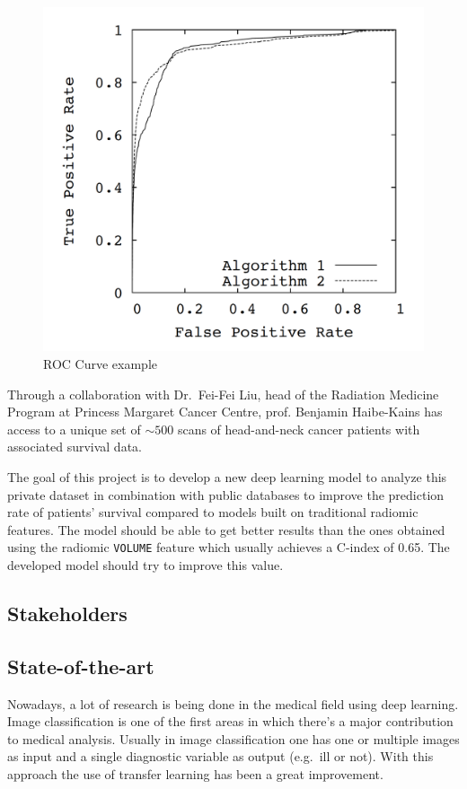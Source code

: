 \begin{figure}
  \centering
  \includegraphics[width=.5\linewidth]{images/roc_curve}
  \caption{ROC Curve example\label{fig:ROC-curve}}
\end{figure}

Through a collaboration with Dr.~Fei-Fei Liu, head of the Radiation Medicine Program at Princess
Margaret Cancer Centre, prof. Benjamin Haibe-Kains has access to a unique set of \( {\sim}500 \) 
scans of head-and-neck cancer patients with associated survival data. 

The goal of this project is to develop a new deep learning model to analyze this private 
dataset in combination with public databases to improve the prediction rate of patients' 
survival compared to models built on traditional radiomic features. The model should be 
able to get better results than the ones obtained using the radiomic \texttt{VOLUME} feature
which usually achieves a C-index of 0.65. The developed model should try to improve this value.


\subsection{Stakeholders}


\subsection{State-of-the-art}

Nowadays, a lot of research is being done in the medical field using deep learning. Image
classification is one of the first areas in which there's a major contribution to medical analysis.
Usually in image classification one has one or multiple images as input and a single diagnostic 
variable as output (e.g.~ill or not). With this approach the use of transfer learning has been a
great improvement.
~\cite{survey-deep-learning}

